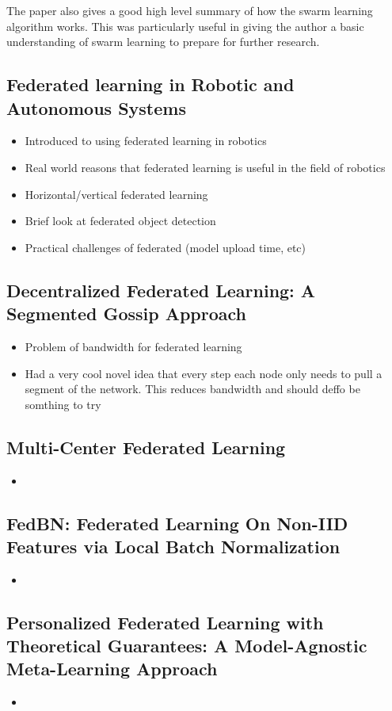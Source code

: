 The paper also gives a good high level summary of how the swarm learning algorithm works. This was particularly useful in giving the author a basic understanding of swarm learning to prepare for further research.

\subsection {Federated learning in Robotic and Autonomous Systems \cite{fed_in_robotics}}
\begin{itemize}
	\item Introduced to using federated learning in robotics
	\item Real world reasons that federated learning is useful in the field of robotics
	\item Horizontal/vertical federated learning
	\item Brief look at federated object detection
	\item Practical challenges of federated (model upload time, etc)
\end{itemize}

\subsection{Decentralized Federated Learning: A Segmented Gossip Approach \cite{gossip_learning}}
\begin{itemize}
	\item Problem of bandwidth for federated learning
	\item Had a very cool novel idea that every step each node only needs to pull a segment of the network. This reduces bandwidth and should deffo be somthing to try
\end{itemize}

\subsection{Multi-Center Federated Learning \cite{multi_center_fed_learning}}
\begin{itemize}
	\item 
\end{itemize}

\subsection{FedBN: Federated Learning On Non-IID Features via Local Batch Normalization \cite{fedbn}}
\begin{itemize}
	\item 
\end{itemize}

\subsection{Personalized Federated Learning with Theoretical Guarantees: A Model-Agnostic Meta-Learning Approach \cite{model_agnostic_meta_learning}}
\begin{itemize}
	\item 
\end{itemize}